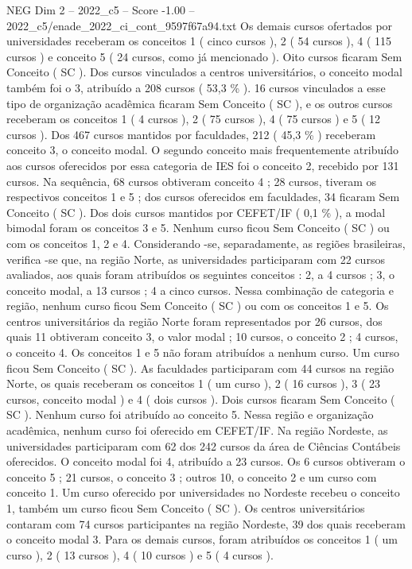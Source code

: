 \begin{textsample}{NEG Dim 2 – 2022\_c5 – Score -1.00 – 2022\_c5/enade\_2022\_ci\_cont\_9597f67a94.txt}
Os demais cursos ofertados por universidades receberam os conceitos 1 ( cinco cursos ), 2 ( 54 cursos ), 4 ( 115 cursos ) e conceito 5 ( 24 cursos, como já mencionado ).
Oito cursos ficaram Sem Conceito ( SC ).
Dos cursos vinculados a centros universitários, o conceito modal também foi o 3, atribuído a 208 cursos ( 53,3 \% ). 16 cursos vinculados a esse tipo de organização acadêmica ficaram Sem Conceito ( SC ), e os outros cursos receberam os conceitos 1 ( 4 cursos ), 2 ( 75 cursos ), 4 ( 75 cursos ) e 5 ( 12 cursos ).
Dos 467 cursos mantidos por faculdades, 212 ( 45,3 \% ) receberam conceito 3, o conceito modal.
O segundo conceito mais frequentemente atribuído aos cursos oferecidos por essa categoria de IES foi o conceito 2, recebido por 131 cursos.
Na sequência, 68 cursos obtiveram conceito 4 ; 28 cursos, tiveram os respectivos conceitos 1 e 5 ; dos cursos oferecidos em faculdades, 34 ficaram Sem Conceito ( SC ).
Dos dois cursos mantidos por CEFET/IF ( 0,1 \% ), a modal bimodal foram os conceitos 3 e 5.
Nenhum curso ficou Sem Conceito ( SC ) ou com os conceitos 1, 2 e 4.
Considerando -se, separadamente, as regiões brasileiras, verifica -se que, na região Norte, as universidades participaram com 22 cursos avaliados, aos quais foram atribuídos os seguintes conceitos : 2, a 4 cursos ; 3, o conceito modal, a 13 cursos ; 4 a cinco cursos.
Nessa combinação de categoria e região, nenhum curso ficou Sem Conceito ( SC ) ou com os conceitos 1 e 5.
Os centros universitários da região Norte foram representados por 26 cursos, dos quais 11 obtiveram conceito 3, o valor modal ; 10 cursos, o conceito 2 ; 4 cursos, o conceito 4.
Os conceitos 1 e 5 não foram atribuídos a nenhum curso.
Um curso ficou Sem Conceito ( SC ).
As faculdades participaram com 44 cursos na região Norte, os quais receberam os conceitos 1 ( um curso ), 2 ( 16 cursos ), 3 ( 23 cursos, conceito modal ) e 4 ( dois cursos ).
Dois cursos ficaram Sem Conceito ( SC ).
Nenhum curso foi atribuído ao conceito 5.
Nessa região e organização acadêmica, nenhum curso foi oferecido em CEFET/IF.
Na região Nordeste, as universidades participaram com 62 dos 242 cursos da área de Ciências Contábeis oferecidos.
O conceito modal foi 4, atribuído a 23 cursos.
Os 6 cursos obtiveram o conceito 5 ; 21 cursos, o conceito 3 ; outros 10, o conceito 2 e um curso com conceito 1.
Um curso oferecido por universidades no Nordeste recebeu o conceito 1, também um curso ficou Sem Conceito ( SC ).
Os centros universitários contaram com 74 cursos participantes na região Nordeste, 39 dos quais receberam o conceito modal 3.
Para os demais cursos, foram atribuídos os conceitos 1 ( um curso ), 2 ( 13 cursos ), 4 ( 10 cursos ) e 5 ( 4 cursos ).

\end{textsample}

